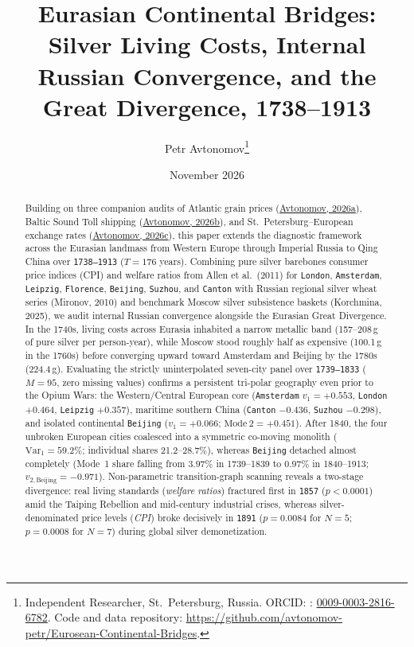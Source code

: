 \documentclass[11pt,a4paper]{article}
\title{\textbf{Eurasian Continental Bridges: Silver Living Costs, Internal Russian Convergence, and the Great Divergence, 1738--1913}}
\author{Petr Avtonomov\thanks{Independent Researcher, St.~Petersburg, Russia. ORCID: : \href{https://orcid.org}{0009-0003-2816-6782}. Code and data repository: \url{https://github.com/avtonomov-petr/Eurosean-Continental-Bridges}.}}
\date{November 2026}
\begin{document}
\maketitle

\begin{abstract}
Building on three companion audits of Atlantic grain prices (\href{https://doi.org}{Avtonomov, 2026a}), Baltic Sound Toll shipping (\href{https://doi.org}{Avtonomov, 2026b}), and St.~Petersburg--European exchange rates (\href{https://doi.org}{Avtonomov, 2026c}), this paper extends the diagnostic framework across the Eurasian landmass from Western Europe through Imperial Russia to Qing China over \texttt{1738--1913} ($T = 176$ years). Combining pure silver barebones consumer price indices (CPI) and welfare ratios from Allen et al.\ (2011) for \texttt{London}, \texttt{Amsterdam}, \texttt{Leipzig}, \texttt{Florence}, \texttt{Beijing}, \texttt{Suzhou}, and \texttt{Canton} with Russian regional silver wheat series (Mironov, 2010) and benchmark Moscow silver subsistence baskets (Korchmina, 2025), we audit internal Russian convergence alongside the Eurasian Great Divergence. In the 1740s, living costs across Eurasia inhabited a narrow metallic band (157--208\,g of pure silver per person-year), while Moscow stood roughly half as expensive (100.1\,g in the 1760s) before converging upward toward Amsterdam and Beijing by the 1780s (224.4\,g). Evaluating the strictly uninterpolated seven-city panel over \texttt{1739--1833} ($M = 95$, zero missing values) confirms a persistent tri-polar geography even prior to the Opium Wars: the Western/Central European core (\texttt{Amsterdam} $v_1 = +0.553$, \texttt{London} $+0.464$, \texttt{Leipzig} $+0.357$), maritime southern China (\texttt{Canton} $-0.436$, \texttt{Suzhou} $-0.298$), and isolated continental \texttt{Beijing} ($v_1 = +0.066$; $\mathrm{Mode~2} = +0.451$). After 1840, the four unbroken European cities coalesced into a symmetric co-moving monolith ($\mathrm{Var}_1 = 59.2\%$; individual shares 21.2--28.7\%), whereas \texttt{Beijing} detached almost completely (Mode~1 share falling from 3.97\% in 1739--1839 to 0.97\% in 1840--1913; $v_{2,\mathrm{Beijing}} = -0.971$). Non-parametric transition-graph scanning reveals a two-stage divergence: real living standards (\emph{welfare ratios}) fractured first in \texttt{1857} ($p < 0.0001$) amid the Taiping Rebellion and mid-century industrial crises, whereas silver-denominated price levels (\emph{CPI}) broke decisively in \texttt{1891} ($p = 0.0084$ for $N=5$; $p = 0.0008$ for $N=7$) during global silver demonetization.
\end{abstract}
\end{document}
